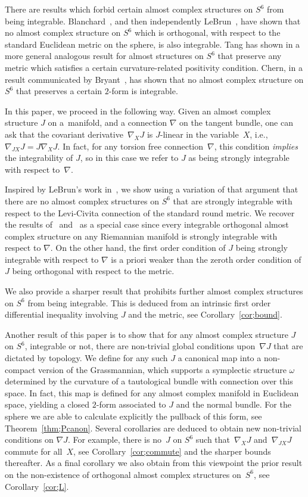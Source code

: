 \documentclass[pdftex]{sigma}
\numberwithin{equation}{section}
\begin{document}
There are results which forbid certain almost complex structures on $S^6$ from being integrable. Blanchard~\cite{Bl}, and then independently LeBrun~\cite{L}, have shown that no almost complex structure on $S^6$ which is orthogonal, with respect to the standard Euclidean metric on the sphere, is also integrable. Tang has shown in \cite{T} a more general analogous result for almost structures on $S^6$ that preserve any metric which satisfies a certain curvature-related positivity condition. Chern, in a result communicated by Bryant~\cite{Br}, has shown that no almost complex structure on $S^6$ that preserves a certain $2$-form is integrable.

In this paper, we proceed in the following way. Given an almost complex structure $J$ on a~manifold, and a connection $\nabla$ on the tangent bundle, one can ask that the covariant derivative~$\nabla_X J$ is $J$-linear in the variable~$X$, i.e., $\nabla_{J X } J = J \nabla_X J$. In fact, for any torsion free connection~$\nabla$, this condition \emph{implies} the integrability of $J$, so in this case we refer to $J$ as being strongly integrable with respect to~$\nabla$.

Inspired by LeBrun's work in~\cite{L}, we show using a variation of that argument that there are no almost complex structures on $S^6$ that are strongly integrable with respect to the Levi-Civita connection of the standard round metric. We recover the results of~\cite{Bl} and~\cite{L} as a special case since every integrable orthogonal almost complex structure on any Riemannian manifold is strongly integrable with respect to $\nabla$. On the other hand, the first order condition of $J$ being strongly integrable with respect to $\nabla$ is a priori weaker than the zeroth order condition of $J$ being orthogonal with respect to the metric.

We also provide a sharper result that prohibits further almost complex structures on $S^6$ from being integrable. This is deduced from an intrinsic first order differential inequality involving $J$ and the metric, see Corollary~\ref{cor;bound}.

Another result of this paper is to show that for any almost complex structure $J$ on $S^6$, integrable or not, there are non-trivial global conditions upon~$\nabla J$ that are dictated by topology. We define for any such $J$ a canonical map into a non-compact version of the Grassmannian, which supports a symplectic structure $\omega$ determined by the curvature of a tautological bundle with connection over this space. In fact, this map is defined for any almost complex manifold in Euclidean space, yielding a closed $2$-form associated to $J$ and the normal bundle. For the sphere we are able to calculate explicitly the pullback of this form, see Theorem~\ref{thm;Pcanon}. Several corollaries are deduced to obtain new non-trivial conditions on $\nabla J$. For example, there is no~$J$ on $S^6$ such that~$\nabla_X J$ and~$\nabla_{JX} J$ commute for all~$X$, see Corollary~\ref{cor;commute} and the sharper bounds thereafter. As a final corollary we also obtain from this viewpoint the prior result on the non-existence of orthogonal almost complex structures on~$S^6$, see Corollary~\ref{cor;L}.
\end{document}
